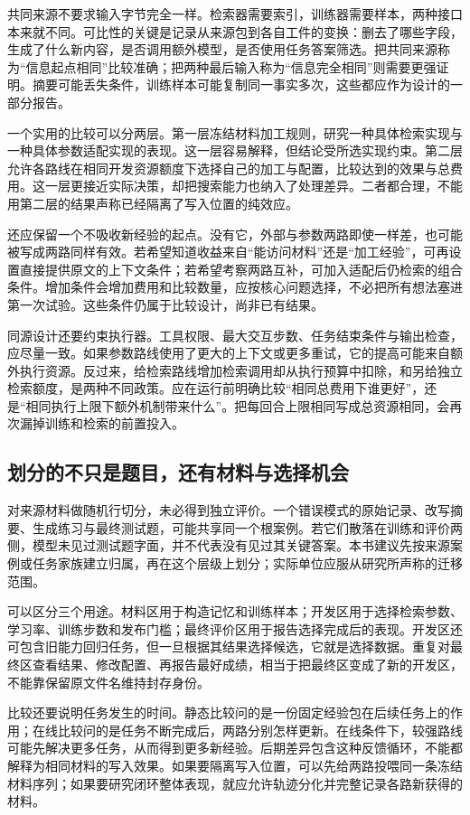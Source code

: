 共同来源不要求输入字节完全一样。检索器需要索引，训练器需要样本，两种接口本来就不同。可比性的关键是记录从来源包到各自工件的变换：删去了哪些字段，生成了什么新内容，是否调用额外模型，是否使用任务答案筛选。把共同来源称为“信息起点相同”比较准确；把两种最后输入称为“信息完全相同”则需要更强证明。摘要可能丢失条件，训练样本可能复制同一事实多次，这些都应作为设计的一部分报告。

一个实用的比较可以分两层。第一层冻结材料加工规则，研究一种具体检索实现与一种具体参数适配实现的表现。这一层容易解释，但结论受所选实现约束。第二层允许各路线在相同开发资源额度下选择自己的加工与配置，比较达到的效果与总费用。这一层更接近实际决策，却把搜索能力也纳入了处理差异。二者都合理，不能用第二层的结果声称已经隔离了写入位置的纯效应。

还应保留一个不吸收新经验的起点。没有它，外部与参数两路即使一样差，也可能被写成两路同样有效。若希望知道收益来自“能访问材料”还是“加工经验”，可再设置直接提供原文的上下文条件；若希望考察两路互补，可加入适配后仍检索的组合条件。增加条件会增加费用和比较数量，应按核心问题选择，不必把所有想法塞进第一次试验。这些条件仍属于比较设计，尚非已有结果。

同源设计还要约束执行器。工具权限、最大交互步数、任务结束条件与输出检查，应尽量一致。如果参数路线使用了更大的上下文或更多重试，它的提高可能来自额外执行资源。反过来，给检索路线增加检索调用却从执行预算中扣除，和另给独立检索额度，是两种不同政策。应在运行前明确比较“相同总费用下谁更好”，还是“相同执行上限下额外机制带来什么”。把每回合上限相同写成总资源相同，会再次漏掉训练和检索的前置投入。

\subsection{划分的不只是题目，还有材料与选择机会}

对来源材料做随机行切分，未必得到独立评价。一个错误模式的原始记录、改写摘要、生成练习与最终测试题，可能共享同一个根案例。若它们散落在训练和评价两侧，模型未见过测试题字面，并不代表没有见过其关键答案。本书建议先按来源案例或任务家族建立归属，再在这个层级上划分；实际单位应服从研究所声称的迁移范围。

可以区分三个用途。材料区用于构造记忆和训练样本；开发区用于选择检索参数、学习率、训练步数和发布门槛；最终评价区用于报告选择完成后的表现。开发区还可包含旧能力回归任务，但一旦根据其结果选择候选，它就是选择数据。重复对最终区查看结果、修改配置、再报告最好成绩，相当于把最终区变成了新的开发区，不能靠保留原文件名维持封存身份。

比较还要说明任务发生的时间。静态比较问的是一份固定经验包在后续任务上的作用；在线比较问的是任务不断完成后，两路分别怎样更新。在线条件下，较强路线可能先解决更多任务，从而得到更多新经验。后期差异包含这种反馈循环，不能都解释为相同材料的写入效果。如果要隔离写入位置，可以先给两路投喂同一条冻结材料序列；如果要研究闭环整体表现，就应允许轨迹分化并完整记录各路新获得的材料。

